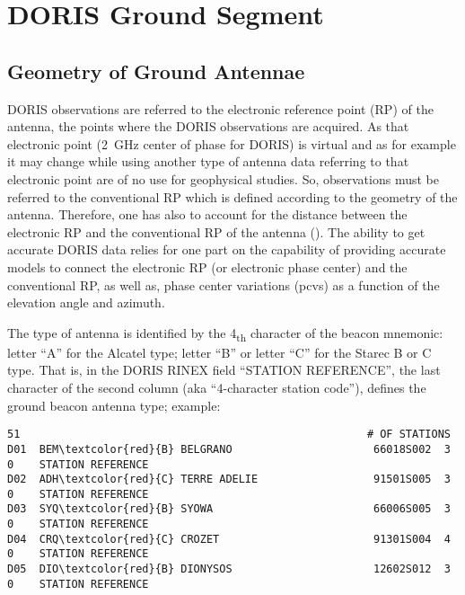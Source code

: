 \chapter{DORIS Ground Segment}
\label{ch:doris-ground-segment}


\section{Geometry of Ground Antennae}
DORIS observations are referred to the electronic reference point (RP) of the antenna, 
the points where the DORIS observations  are  acquired.  As  that  electronic  point 
(\SI{2}{\GHz} center of phase for DORIS) is virtual and as for example it may change 
while using another type of antenna data referring to that electronic point are of no 
use for geophysical studies. So, observations must be referred to the conventional RP 
which is defined according to the geometry of the antenna. Therefore, one has also to 
account for the distance between the electronic RP and the conventional RP of the antenna (\cite{TOURAIN2016}). 
The ability to get accurate DORIS data relies for one part on the capability of providing 
accurate models to connect the  electronic RP (or electronic phase center) and the conventional 
RP, as well as, phase center variations (\gls{pcv}s) as a function of the elevation angle and azimuth.

The type of antenna is identified by the 4\textsubscript{th} character of the beacon 
mnemonic: letter ``A'' for the Alcatel type; letter ``B'' or letter ``C'' for the 
Starec B or C type.  That is, in the DORIS RINEX field ``STATION REFERENCE'', the 
last character of the second column (aka ``4-character station code''), defines the 
ground beacon antenna type; example:
\begin{Verbatim}[commandchars=\\\{\}]
    51                                                      # OF STATIONS       
D01  BEM\textcolor{red}{B} BELGRANO                      66018S002  3   0    STATION REFERENCE   
D02  ADH\textcolor{red}{C} TERRE ADELIE                  91501S005  3   0    STATION REFERENCE   
D03  SYQ\textcolor{red}{B} SYOWA                         66006S005  3   0    STATION REFERENCE   
D04  CRQ\textcolor{red}{C} CROZET                        91301S004  4   0    STATION REFERENCE   
D05  DIO\textcolor{red}{B} DIONYSOS                      12602S012  3   0    STATION REFERENCE
\end{Verbatim}

